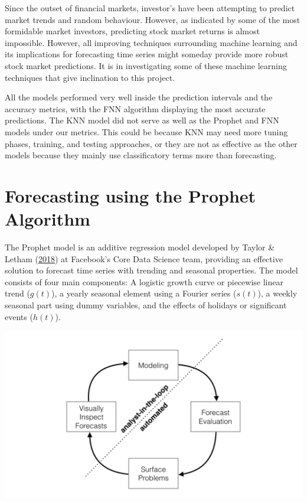 \documentclass[11pt,preprint, authoryear]{elsarticle}
\let\origfigure\figure
\let\endorigfigure\endfigure
\renewenvironment{figure}[1][2] {
    \expandafter\origfigure\expandafter[H]
} {
    \endorigfigure
}
\numberwithin{equation}{section}
\numberwithin{figure}{section}
\numberwithin{table}{section}
\begin{document}
Since the outset of financial markets, investor's have been attempting
to predict market trends and random behaviour. However, as indicated by
some of the most formidable market investors, predicting stock market
returns is almost impossible. However, all improving techniques
surrounding machine learning and its implications for forecasting time
series might someday provide more robust stock market predictions. It is
in investigating some of these machine learning techniques that give
inclination to this project.

All the models performed very well inside the prediction intervals and
the accuracy metrics, with the FNN algorithm displaying the most
accurate predictions. The KNN model did not serve as well as the Prophet
and FNN models under our metrics. This could be because KNN may need
more tuning phases, training, and testing approaches, or they are not as
effective as the other models because they mainly use classificatory
terms more than forecasting.

\hypertarget{forecasting-using-the-prophet-algorithm}{%
\section{Forecasting using the Prophet
Algorithm}\label{forecasting-using-the-prophet-algorithm}}

The Prophet model is an additive regression model developed by Taylor \&
Letham (\protect\hyperlink{ref-taylor2018}{2018}) at Facebook's Core
Data Science team, providing an effective solution to forecast time
series with trending and seasonal properties. The model consists of four
main components: A logistic growth curve or piecewise linear trend
(\(g(t)\)), a yearly seasonal element using a Fourier series (\(s(t)\)),
a weekly seasonal part using dummy variables, and the effects of
holidays or significant events (\(h(t)\)).

\begin{figure}[H]

{\centering \includegraphics[width=0.7\linewidth]{code/prophet} 

}

\caption{The dynamics of the Prophet algorithm. \label{image1}}\label{fig:unnamed-chunk-1}
\end{figure}
\end{document}
